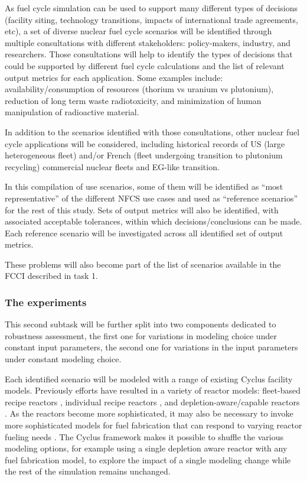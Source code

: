 As fuel cycle simulation can be used to support many different types of
decisions (facility siting, technology transitions, impacts of international
trade agreements, etc), a set of diverse nuclear fuel cycle scenarios will be
identified through multiple consultations with different stakeholders:
policy-makers, industry, and researchers.  Those consultations will help to
identify the types of decisions that could be supported by different fuel
cycle calculations and the list of relevant output metrics for each
application.  Some examples include: availability/consumption of resources
(thorium vs uranium vs plutonium), reduction of long term waste
radiotoxicity, and minimization of human manipulation of radioactive material.

In addition to the scenarios identified with those consultations, other
nuclear fuel cycle applications will be considered, including historical
records of US (large heterogeneous fleet) and/or French (fleet undergoing
transition to plutonium recycling)\cite{courtin.phd} commercial
nuclear fleets and EG-like transition\cite{Bo.ANSW.2016}.

In this compilation of use scenarios, some of them will be identified as
``most representative'' of the different \gls{NFCS} use cases and used as
``reference scenarios'' for the rest of this study. Sets of output metrics
will also be identified, with associated acceptable tolerances, within which
decisions/conclusions can be made. Each reference scenario will be
investigated across all identified set of output metrics.

These problems will also become part of the list of scenarios available in the
\gls{FCCI} described in task 1.

\subsubsection{The experiments}

This second subtask will be further split into two components dedicated to
robustness assessment, the first one for variations in modeling choice under
constant input parameters, the second one for variations in the input
parameters under constant modeling choice.

Each identified scenario will be modeled with a range of existing Cyclus
facility models.  Previously efforts have resulted in a variety of reactor
models: fleet-based recipe reactors \cite{carlsen.NT.2016}, individual recipe
reactors \cite{cycamore.1.5.0}, and depletion-aware/capable reactors
\cite{cyborg, brightlite.2015, cyclass.2016}.  As the reactors become more
sophisticated, it may also be necessary to invoke more sophisticated models for
fuel fabrication that can respond to varying reactor fueling needs
\cite{brightlite.2015, cyclass.2016}. The Cyclus framework makes it possible to
shuffle the various modeling options, for example using a single depletion aware
reactor with any fuel fabrication model, to explore the impact of a single
modeling change while the rest of the simulation remains unchanged.

